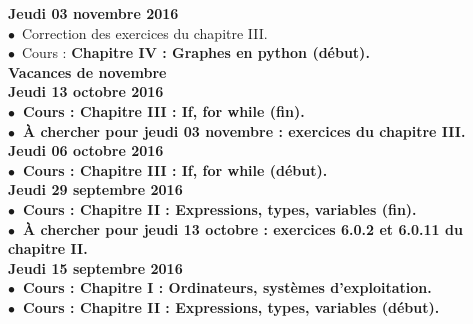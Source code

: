 \documentclass[12pt,a4paper]{article}
\begin{document}
\noindent\textbf{\bf Jeudi 03 novembre 2016 \rm}\\
$\bullet$\ Correction des exercices du chapitre III.\\
$\bullet$\ Cours : \bf Chapitre IV \rm : Graphes en python (début).\vspace{.4cm}\\

\noindent\textbf{ Vacances de novembre }\vspace{.4cm}\\

\noindent\textbf{\bf Jeudi 13 octobre 2016 \rm}\\
$\bullet$\ Cours : \bf Chapitre III \rm : If, for while (fin).\vspace{.4cm}\\
$\bullet$\ À chercher pour jeudi 03 novembre : exercices du chapitre III.\vspace{.4cm}\\
  
\noindent\textbf{\bf Jeudi 06 octobre 2016 \rm}\\
$\bullet$\ Cours : \bf Chapitre III \rm : If, for while (début).\vspace{.4cm}\\
  
\noindent\textbf{\bf Jeudi 29 septembre 2016 \rm}\\
$\bullet$\ Cours :  \bf Chapitre II \rm : Expressions, types, variables (fin).\\
$\bullet$\ À chercher pour jeudi 13 octobre : exercices 6.0.2 et 6.0.11 du chapitre 
II.\vspace{.4cm}\\

\noindent\textbf{\bf Jeudi 15 septembre 2016 \rm}\\
$\bullet$\ Cours :  \bf Chapitre I \rm : Ordinateurs, systèmes d'exploitation.\vspace{.4cm}\\
$\bullet$\ Cours :  \bf Chapitre II \rm : Expressions, types, variables (début).\vspace{.4cm}\\


\label{end}
\end{document}
